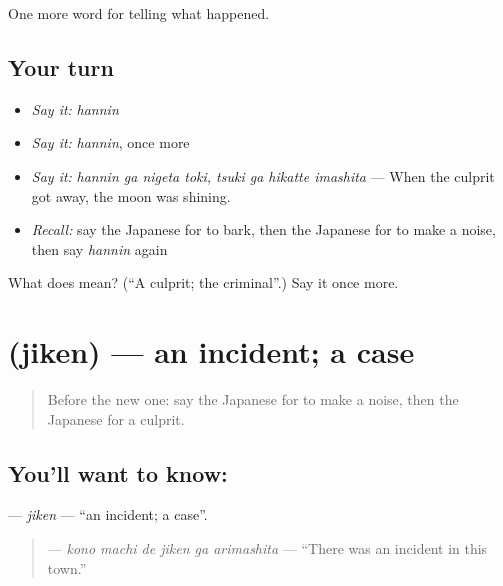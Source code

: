 \begin{grammarlens}[title={What you've built}]
One more word for telling what happened.
\end{grammarlens}

\subsection*{Your turn}
\begin{itemize}
\raggedright
  \item \emph{Say it:} \emph{hannin}
  \item \emph{Say it:} \emph{hannin}, once more
  \item \emph{Say it:} \emph{hannin ga nigeta toki, tsuki ga hikatte imashita} — When the culprit got away, the moon was shining.
  \item \emph{Recall:} say the Japanese for to bark, then the Japanese for to make a noise, then say \emph{hannin} again
\end{itemize}

\begin{tcolorbox}[breakable,colback=teal!4,colframe=teal!35!black,title={Before you move on}]
What does  mean? (\textquotedblleft{}A culprit; the criminal\textquotedblright{}.) Say it once more.
\end{tcolorbox}
\section[\texorpdfstring{\ja{じけん} (jiken)}{じけん (jiken)}]{ (jiken) — an incident; a case}

\label{lesson:JA-C270-jiken}



\begin{quote}
Before the new one: say the Japanese for to make a noise, then the Japanese for a culprit.
\end{quote}

\subsection*{You'll want to know: }
\textbf{} — \emph{jiken} — \textquotedblleft{}an incident; a case\textquotedblright{}.

\begin{quote}
\textbf{   } — \emph{kono machi de jiken ga arimashita} — \textquotedblleft{}There was an incident in this town.\textquotedblright{}
\end{quote}

